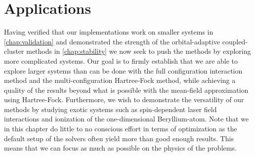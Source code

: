 \chapter{Applications}
    Having verified that our implementations work on smaller systems in
    \autoref{chap:validation} and demonstrated the strength of the
    orbital-adaptive coupled-cluster methods in \autoref{chap:stability} we now
    seek to push the methods by exploring more complicated systems.
    Our goal is to firmly establish that we are able to explore larger systems
    than can be done with the full configuration interaction method and the
    multi-configuration Hartree-Fock method, while achieving a quality of the
    results beyond what is possible with the mean-field approximation using
    Hartree-Fock.
    Furthermore, we wish to demonstrate the versatility of our methods by
    studying exotic systems such as spin-dependent laser field interactions and
    ionization of the one-dimensional Beryllium-atom.
    Note that we in this chapter do little to no conscious effort in terms of
    optimization as the default setup of the solvers often yield more than good
    enough results.
    This means that we can focus as much as possible on the physics of the
    problems.

